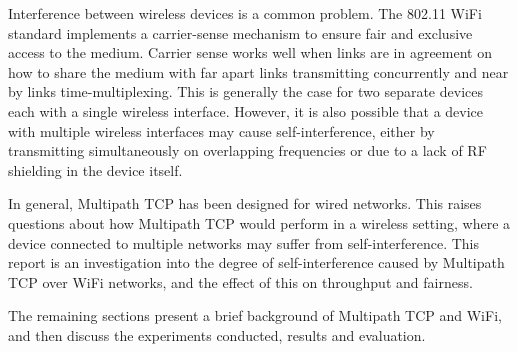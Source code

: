 Interference between wireless devices is a common problem. The 802.11 WiFi
standard implements a carrier-sense mechanism to ensure fair and exclusive
access to the medium. Carrier sense works well when links are in agreement on 
how to share the medium with far apart links transmitting concurrently and near 
by links time-multiplexing. This is generally the case for two separate devices 
each with a single wireless interface. However, it is also possible that a 
device with multiple wireless interfaces may cause self-interference, either by 
transmitting simultaneously on overlapping frequencies or due to a lack of RF 
shielding in the device itself.

In general, Multipath TCP has been designed for wired networks. This raises
questions about how Multipath TCP would perform in a wireless setting, where a
device connected to multiple networks may suffer from self-interference. This
report is an investigation into the degree of self-interference caused by
Multipath TCP over WiFi networks, and the effect of this on throughput and
fairness.

The remaining sections present a brief background of Multipath TCP and WiFi, and
then discuss the experiments conducted, results and evaluation.
